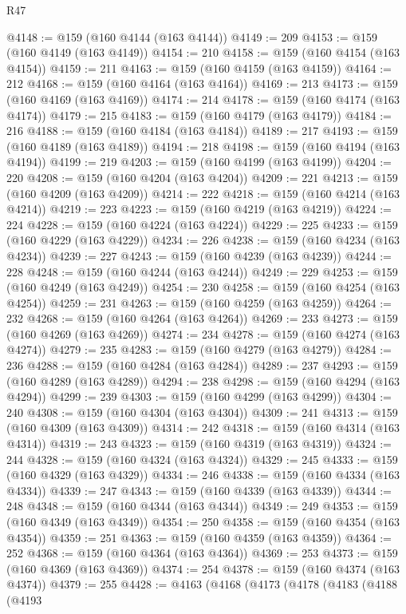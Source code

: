 \begin{lexlean}{R47}
\begin{coremodule}
@4148 := @159 (@160 @4144 (@163 @4144))
@4149 := 209
@4153 := @159 (@160 @4149 (@163 @4149))
@4154 := 210
@4158 := @159 (@160 @4154 (@163 @4154))
@4159 := 211
@4163 := @159 (@160 @4159 (@163 @4159))
@4164 := 212
@4168 := @159 (@160 @4164 (@163 @4164))
@4169 := 213
@4173 := @159 (@160 @4169 (@163 @4169))
@4174 := 214
@4178 := @159 (@160 @4174 (@163 @4174))
@4179 := 215
@4183 := @159 (@160 @4179 (@163 @4179))
@4184 := 216
@4188 := @159 (@160 @4184 (@163 @4184))
@4189 := 217
@4193 := @159 (@160 @4189 (@163 @4189))
@4194 := 218
@4198 := @159 (@160 @4194 (@163 @4194))
@4199 := 219
@4203 := @159 (@160 @4199 (@163 @4199))
@4204 := 220
@4208 := @159 (@160 @4204 (@163 @4204))
@4209 := 221
@4213 := @159 (@160 @4209 (@163 @4209))
@4214 := 222
@4218 := @159 (@160 @4214 (@163 @4214))
@4219 := 223
@4223 := @159 (@160 @4219 (@163 @4219))
@4224 := 224
@4228 := @159 (@160 @4224 (@163 @4224))
@4229 := 225
@4233 := @159 (@160 @4229 (@163 @4229))
@4234 := 226
@4238 := @159 (@160 @4234 (@163 @4234))
@4239 := 227
@4243 := @159 (@160 @4239 (@163 @4239))
@4244 := 228
@4248 := @159 (@160 @4244 (@163 @4244))
@4249 := 229
@4253 := @159 (@160 @4249 (@163 @4249))
@4254 := 230
@4258 := @159 (@160 @4254 (@163 @4254))
@4259 := 231
@4263 := @159 (@160 @4259 (@163 @4259))
@4264 := 232
@4268 := @159 (@160 @4264 (@163 @4264))
@4269 := 233
@4273 := @159 (@160 @4269 (@163 @4269))
@4274 := 234
@4278 := @159 (@160 @4274 (@163 @4274))
@4279 := 235
@4283 := @159 (@160 @4279 (@163 @4279))
@4284 := 236
@4288 := @159 (@160 @4284 (@163 @4284))
@4289 := 237
@4293 := @159 (@160 @4289 (@163 @4289))
@4294 := 238
@4298 := @159 (@160 @4294 (@163 @4294))
@4299 := 239
@4303 := @159 (@160 @4299 (@163 @4299))
@4304 := 240
@4308 := @159 (@160 @4304 (@163 @4304))
@4309 := 241
@4313 := @159 (@160 @4309 (@163 @4309))
@4314 := 242
@4318 := @159 (@160 @4314 (@163 @4314))
@4319 := 243
@4323 := @159 (@160 @4319 (@163 @4319))
@4324 := 244
@4328 := @159 (@160 @4324 (@163 @4324))
@4329 := 245
@4333 := @159 (@160 @4329 (@163 @4329))
@4334 := 246
@4338 := @159 (@160 @4334 (@163 @4334))
@4339 := 247
@4343 := @159 (@160 @4339 (@163 @4339))
@4344 := 248
@4348 := @159 (@160 @4344 (@163 @4344))
@4349 := 249
@4353 := @159 (@160 @4349 (@163 @4349))
@4354 := 250
@4358 := @159 (@160 @4354 (@163 @4354))
@4359 := 251
@4363 := @159 (@160 @4359 (@163 @4359))
@4364 := 252
@4368 := @159 (@160 @4364 (@163 @4364))
@4369 := 253
@4373 := @159 (@160 @4369 (@163 @4369))
@4374 := 254
@4378 := @159 (@160 @4374 (@163 @4374))
@4379 := 255
@4428 := @4163
    (@4168
      (@4173
        (@4178
          (@4183
            (@4188
              (@4193

\end{coremodule}
\end{lexlean}
